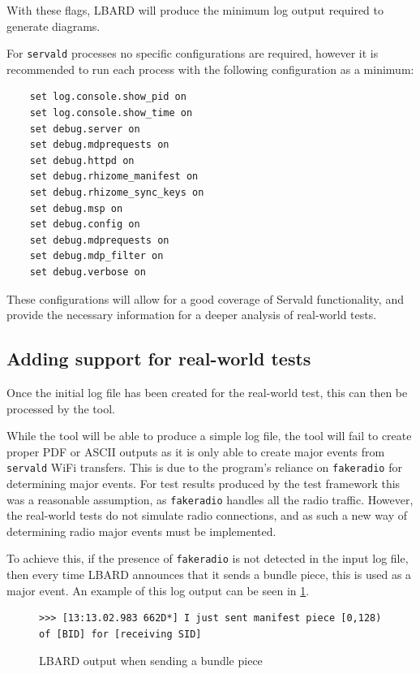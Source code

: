 With these flags, LBARD will produce the minimum log output required to generate diagrams. 

For \texttt{servald} processes no specific configurations are required, however it is recommended to run each process with the following configuration as a minimum:
\begin{lstlisting}
    set log.console.show_pid on 
    set log.console.show_time on 
    set debug.server on 
    set debug.mdprequests on 
    set debug.httpd on 
    set debug.rhizome_manifest on
    set debug.rhizome_sync_keys on
    set debug.msp on
    set debug.config on
    set debug.mdprequests on
    set debug.mdp_filter on
    set debug.verbose on
\end{lstlisting}
These configurations will allow for a good coverage of Servald functionality, and provide the necessary information for a deeper analysis of real-world tests.


\subsection{Adding support for real-world tests}
Once the initial log file has been created for the real-world test, this can then be processed by the tool.

While the tool will be able to produce a simple log file, the tool will fail to create proper PDF or ASCII outputs as it is only able to create major events from \texttt{servald} WiFi transfers.
This is due to the program's reliance on \texttt{fakeradio} for determining major events.
For test results produced by the test framework this was a reasonable assumption, as \texttt{fakeradio} handles all the radio traffic.
However, the real-world tests do not simulate radio connections, and as such a new way of determining radio major events must be implemented.

To achieve this, if the presence of \texttt{fakeradio} is not detected in the input log file, then every time LBARD announces that it sends a bundle piece, this is used as a major event.
An example of this log output can be seen in \figurename{ \ref{fig:chapter6RLBARDSent}}.

\begin{figure}
    \begin{centering}
\begin{lstlisting}[basicstyle=\small, breaklines]
    >>> [13:13.02.983 662D*] I just sent manifest piece [0,128) of [BID] for [receiving SID]
\end{lstlisting}
        \caption{LBARD output when sending a bundle piece}
        \label{fig:chapter6RLBARDSent}
    \end{centering}
\end{figure}

